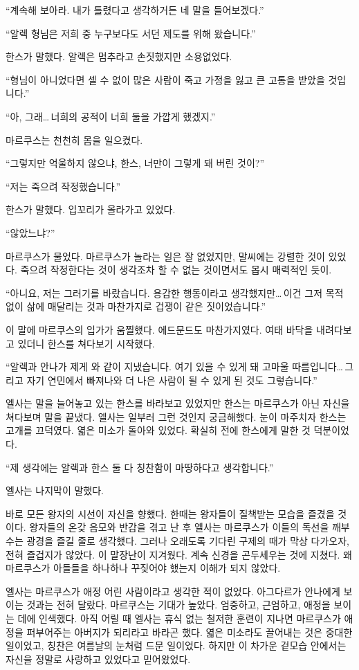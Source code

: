 ``계속해 보아라. 내가 틀렸다고 생각하거든 네 말을 들어보겠다.''

``알렉 형님은 저희 중 누구보다도 서던 제도를 위해 왔습니다.''

한스가 말했다. 알렉은 멈추라고 손짓했지만 소용없었다.

``형님이 아니었다면 셀 수 없이 많은 사람이 죽고 가정을 잃고 큰 고통을 받았을 것입니다.''

``아, 그래\ldots\,너희의 공적이 너희 둘을 가깝게 했겠지.''

마르쿠스는 천천히 몸을 일으켰다.

``그렇지만 억울하지 않으냐, 한스, 너만이 그렇게 돼 버린 것이?''

``저는 죽으려 작정했습니다.''

한스가 말했다. 입꼬리가 올라가고 있었다.

`` 않았느냐?''

마르쿠스가 물었다. 마르쿠스가 놀라는 일은 잘 없었지만, 말씨에는 강렬한 것이 있었다. 죽으려 작정한다는 것이 생각조차 할 수 없는 것이면서도 몹시 매력적인 듯이.

``아니요, 저는 그러기를 바랐습니다. 용감한 행동이라고 생각했지만\ldots\,이건 그저 목적 없이 삶에 매달리는 것과 마찬가지로 겁쟁이 같은 짓이었습니다.''

이 말에 마르쿠스의 입가가 움찔했다. 에드문드도 마찬가지였다. 여태 바닥을 내려다보고 있더니 한스를 쳐다보기 시작했다.

``알렉과 안나가 제게 와 같이 지냈습니다. 여기 있을 수 있게 돼 고마울 따름입니다\ldots\,그리고 자기 연민에서 빠져나와 더 나은 사람이 될 수 있게 된 것도 그렇습니다.''

엘사는 말을 늘어놓고 있는 한스를 바라보고 있었지만 한스는 마르쿠스가 아닌 자신을 쳐다보며 말을 끝냈다. 엘사는 일부러 그런 것인지 궁금해했다. 눈이 마주치자 한스는 고개를 끄덕였다. 엷은 미소가 돌아와 있었다. 확실히 전에 한스에게 말한 것 덕분이었다.

``제 생각에는 알렉과 한스 둘 다 칭찬함이 마땅하다고 생각합니다.''

엘사는 나지막이 말했다.

바로 모든 왕자의 시선이 자신을 향했다. 한때는 왕자들이 질책받는 모습을 즐겼을 것이다. 왕자들의 온갖 음모와 반감을 겪고 난 후 엘사는 마르쿠스가 이들의 독선을 깨부수는 광경을 즐길 줄로 생각했다. 그러나 오래도록 기다린 구제의 때가 막상 다가오자, 전혀 즐겁지가 않았다. 이 말장난이 지겨웠다. 계속 신경을 곤두세우는 것에 지쳤다. 왜 마르쿠스가 아들들을 하나하나 꾸짖어야 했는지 이해가 되지 않았다.

엘사는 마르쿠스가 애정 어린 사람이라고 생각한 적이 없었다. 아그다르가 안나에게 보이는 것과는 전혀 달랐다. 마르쿠스는 기대가 높았다. 엄중하고, 근엄하고, 애정을 보이는 데에 인색했다. 아직 어릴 때 엘사는 휴식 없는 철저한 훈련이 지나면 마르쿠스가 애정을 퍼부어주는 아버지가 되리라고 바라곤 했다. 엷은 미소라도 끌어내는 것은 중대한 일이었고, 칭찬은 여름날의 눈처럼 드문 일이었다. 하지만 이 차가운 겉모습 안에서는 자신을 정말로 사랑하고 있었다고 믿어왔었다.

